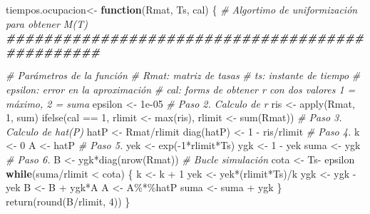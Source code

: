 \documentclass[
]{book}
\newenvironment{Shaded}{\begin{snugshade}}{\end{snugshade}}
\newcommand{\CommentTok}[1]{\textcolor[rgb]{0.56,0.35,0.01}{\textit{#1}}}
\newcommand{\ControlFlowTok}[1]{\textcolor[rgb]{0.13,0.29,0.53}{\textbf{#1}}}
\newcommand{\DecValTok}[1]{\textcolor[rgb]{0.00,0.00,0.81}{#1}}
\newcommand{\DocumentationTok}[1]{\textcolor[rgb]{0.56,0.35,0.01}{\textbf{\textit{#1}}}}
\newcommand{\FloatTok}[1]{\textcolor[rgb]{0.00,0.00,0.81}{#1}}
\newcommand{\FunctionTok}[1]{\textcolor[rgb]{0.00,0.00,0.00}{#1}}
\newcommand{\NormalTok}[1]{#1}
\newcommand{\OtherTok}[1]{\textcolor[rgb]{0.56,0.35,0.01}{#1}}
\newcommand{\SpecialCharTok}[1]{\textcolor[rgb]{0.00,0.00,0.00}{#1}}
\theoremstyle{definition}
\theoremstyle{definition}
\theoremstyle{definition}
\theoremstyle{definition}
\theoremstyle{remark}
\begin{document}
\begin{Shaded}
\begin{Highlighting}[]
\NormalTok{tiempos.ocupacion}\OtherTok{\textless{}{-}} \ControlFlowTok{function}\NormalTok{(Rmat, Ts, cal)}
\NormalTok{\{}
  \CommentTok{\# Algortimo de uniformización para obtener M(T)}
  \DocumentationTok{\#\#\#\#\#\#\#\#\#\#\#\#\#\#\#\#\#\#\#\#\#\#\#\#\#\#\#\#\#\#\#\#\#\#\#\#\#\#\#\#\#\#\#\#\#\#\#\#}
  
  \CommentTok{\# Parámetros de la función}
  \CommentTok{\# Rmat: matriz de tasas}
  \CommentTok{\# ts: instante de tiempo}
  \CommentTok{\# epsilon: error en la aproximación}
  \CommentTok{\# cal: forms de obtener r con dos valores 1 = máximo, 2 = suma}
\NormalTok{  epsilon }\OtherTok{\textless{}{-}} \FloatTok{1e{-}05}
  \CommentTok{\# Paso 2. Calculo de r}
\NormalTok{  ris }\OtherTok{\textless{}{-}} \FunctionTok{apply}\NormalTok{(Rmat, }\DecValTok{1}\NormalTok{, sum)}
  \FunctionTok{ifelse}\NormalTok{(cal }\SpecialCharTok{==} \DecValTok{1}\NormalTok{, rlimit }\OtherTok{\textless{}{-}} \FunctionTok{max}\NormalTok{(ris), rlimit }\OtherTok{\textless{}{-}} \FunctionTok{sum}\NormalTok{(Rmat))}
  \CommentTok{\# Paso 3. Calculo de hat(P)}
\NormalTok{  hatP }\OtherTok{\textless{}{-}}\NormalTok{ Rmat}\SpecialCharTok{/}\NormalTok{rlimit}
  \FunctionTok{diag}\NormalTok{(hatP) }\OtherTok{\textless{}{-}} \DecValTok{1} \SpecialCharTok{{-}}\NormalTok{ ris}\SpecialCharTok{/}\NormalTok{rlimit}
  \CommentTok{\# Paso 4. }
\NormalTok{  k }\OtherTok{\textless{}{-}} \DecValTok{0}
\NormalTok{  A }\OtherTok{\textless{}{-}}\NormalTok{ hatP}
  \CommentTok{\# Paso 5.}
\NormalTok{  yek }\OtherTok{\textless{}{-}} \FunctionTok{exp}\NormalTok{(}\SpecialCharTok{{-}}\DecValTok{1}\SpecialCharTok{*}\NormalTok{rlimit}\SpecialCharTok{*}\NormalTok{Ts)}
\NormalTok{  ygk }\OtherTok{\textless{}{-}} \DecValTok{1} \SpecialCharTok{{-}}\NormalTok{ yek}
\NormalTok{  suma }\OtherTok{\textless{}{-}}\NormalTok{ ygk}
  \CommentTok{\# Paso 6.}
\NormalTok{  B }\OtherTok{\textless{}{-}}\NormalTok{ ygk}\SpecialCharTok{*}\FunctionTok{diag}\NormalTok{(}\FunctionTok{nrow}\NormalTok{(Rmat))}
  \CommentTok{\# Bucle simulación}
\NormalTok{  cota }\OtherTok{\textless{}{-}}\NormalTok{ Ts}\SpecialCharTok{{-}}\NormalTok{ epsilon}
  \ControlFlowTok{while}\NormalTok{(suma}\SpecialCharTok{/}\NormalTok{rlimit }\SpecialCharTok{\textless{}}\NormalTok{ cota)}
\NormalTok{  \{}
\NormalTok{    k }\OtherTok{\textless{}{-}}\NormalTok{ k }\SpecialCharTok{+} \DecValTok{1}
\NormalTok{    yek }\OtherTok{\textless{}{-}}\NormalTok{ yek}\SpecialCharTok{*}\NormalTok{(rlimit}\SpecialCharTok{*}\NormalTok{Ts)}\SpecialCharTok{/}\NormalTok{k}
\NormalTok{    ygk }\OtherTok{\textless{}{-}}\NormalTok{ ygk }\SpecialCharTok{{-}}\NormalTok{ yek}
\NormalTok{    B }\OtherTok{\textless{}{-}}\NormalTok{ B }\SpecialCharTok{+}\NormalTok{ ygk}\SpecialCharTok{*}\NormalTok{A}
\NormalTok{    A }\OtherTok{\textless{}{-}}\NormalTok{ A}\SpecialCharTok{\%*\%}\NormalTok{hatP}
\NormalTok{    suma }\OtherTok{\textless{}{-}}\NormalTok{ suma }\SpecialCharTok{+}\NormalTok{ ygk}
\NormalTok{  \}}
  \FunctionTok{return}\NormalTok{(}\FunctionTok{round}\NormalTok{(B}\SpecialCharTok{/}\NormalTok{rlimit, }\DecValTok{4}\NormalTok{))}
\NormalTok{\}}
\end{Highlighting}
\end{Shaded}
\end{document}
